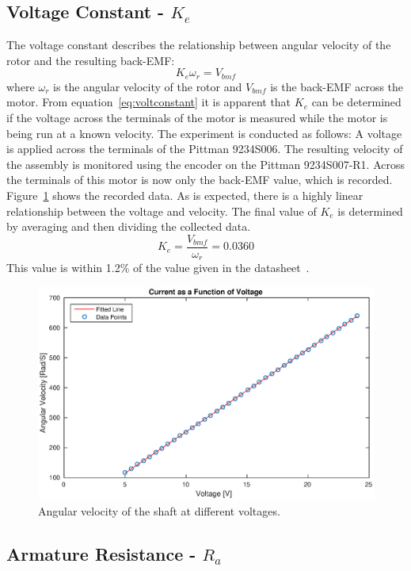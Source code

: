 \subsection{Voltage Constant - $K_e$}
\label{sec:voltconstat}
The voltage constant describes the relationship between angular velocity of the rotor and the resulting back-EMF:
\begin{equation}
	\label{eq:voltconstant}
	K_e\omega_r = V_{bmf}
\end{equation}
where $\omega_r$ is the angular velocity of the rotor and $V_{bmf}$ is the back-EMF across the motor.
From equation~\ref{eq:voltconstant} it is apparent that $K_e$ can be determined if the voltage across the terminals of the motor is measured while the motor is being run at a known velocity.
The experiment is conducted as follows:
A voltage is applied across the terminals of the Pittman 9234S006.
The resulting velocity of the assembly is monitored using the encoder on the Pittman 9234S007-R1.
Across the terminals of this motor is now only the back-EMF value, which is recorded.
Figure~\ref{fig:velvsvolt} shows the recorded data. 
As is expected, there is a highly linear relationship between the voltage and velocity.
The final value of $K_e$ is determined by averaging and then dividing the collected data.
$$K_e=\frac{V_{bmf}}{\omega_r}=0.0360$$
This value is within 1.2\% of the value given in the datasheet~\cite{pittmann}.

\begin{figure}[!h]
	\centering
	\includegraphics[width=.75\linewidth]{graphics/vvsrpm}
	\caption{Angular velocity of the shaft at different voltages.}
	\label{fig:velvsvolt}
\end{figure}

\subsection{Armature Resistance - $R_a$}
\label{sec:armature}
